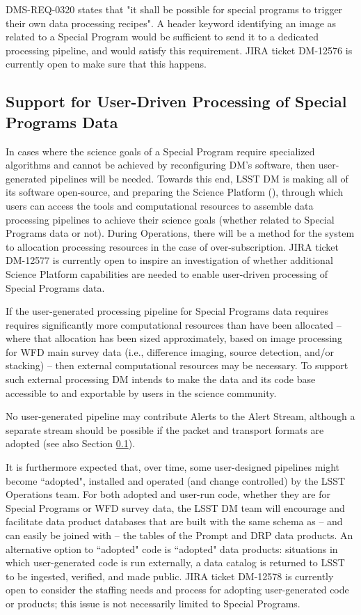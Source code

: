 \documentclass[DM,lsstdoc,toc]{lsstdoc}
\begin{document}
DMS-REQ-0320 states that "it shall be possible for special programs to trigger their own data processing recipes". A header keyword identifying an image as related to a Special Program would be sufficient to send it to a dedicated processing pipeline, and would satisfy this requirement. JIRA ticket DM-12576 is currently open to make sure that this happens. 


\subsection{Support for User-Driven Processing of Special Programs Data}\label{ssec:dmplans_user}

In cases where the science goals of a Special Program require specialized algorithms and cannot be achieved by reconfiguring DM's software, then user-generated pipelines will be needed. Towards this end, LSST DM is making all of its software open-source, and preparing the Science Platform (), through which users can access the tools and computational resources to assemble data processing pipelines to achieve their science goals (whether related to Special Programs data or not). During Operations, there will be a method for the system to allocation processing resources in the case of over-subscription. JIRA ticket DM-12577 is currently open to inspire an investigation of whether additional Science Platform capabilities are needed to enable user-driven processing of Special Programs data.

If the user-generated processing pipeline for Special Programs data requires requires significantly more computational resources than have been allocated -- where that allocation has been sized approximately, based on image processing for WFD main survey data (i.e., difference imaging, source detection, and/or stacking) -- then external computational resources may be necessary. To support such external processing DM intends to make the data and its code base accessible to and exportable by users in the science community.

No user-generated pipeline may contribute Alerts to the Alert Stream, although a separate stream should be possible if the packet and transport formats are adopted (see also Section \ref{ssec:dmplans_user}).

It is furthermore expected that, over time, some user-designed pipelines might become ``adopted", installed and operated (and change controlled) by the LSST Operations team. For both adopted and user-run code, whether they are for Special Programs or WFD survey data, the LSST DM team will encourage and facilitate data product databases that are built with the same schema as -- and can easily be joined with -- the tables of the Prompt and DRP data products. An alternative option to ``adopted" code is ``adopted" data products: situations in which user-generated code is run externally, a data catalog is returned to LSST to be ingested, verified, and made public. JIRA ticket DM-12578 is currently open to consider the staffing needs and process for adopting user-generated code or products; this issue is not necessarily limited to Special Programs. 
\end{document}

